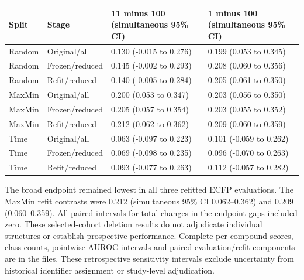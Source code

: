 \begin{center}
\footnotesize
\begin{tabularx}{\linewidth}{llXX}
\toprule
Split & Stage & 11 minus 100 (simultaneous 95\% CI) & 1 minus 100 (simultaneous 95\% CI) \\
\midrule
Random & Original/all & 0.130 (-0.015 to 0.276) & 0.199 (0.053 to 0.345) \\
Random & Frozen/reduced & 0.145 (-0.002 to 0.293) & 0.208 (0.060 to 0.356) \\
Random & Refit/reduced & 0.140 (-0.005 to 0.284) & 0.205 (0.061 to 0.350) \\
MaxMin & Original/all & 0.200 (0.053 to 0.347) & 0.203 (0.056 to 0.350) \\
MaxMin & Frozen/reduced & 0.205 (0.057 to 0.354) & 0.203 (0.055 to 0.352) \\
MaxMin & Refit/reduced & 0.212 (0.062 to 0.362) & 0.209 (0.060 to 0.359) \\
Time & Original/all & 0.063 (-0.097 to 0.223) & 0.101 (-0.059 to 0.262) \\
Time & Frozen/reduced & 0.069 (-0.098 to 0.235) & 0.096 (-0.070 to 0.263) \\
Time & Refit/reduced & 0.093 (-0.077 to 0.263) & 0.112 (-0.057 to 0.282) \\
\bottomrule
\end{tabularx}
\end{center}
The broad endpoint remained lowest in all three refitted ECFP evaluations. The MaxMin refit contrasts were 0.212 (simultaneous 95\% CI 0.062--0.362) and 0.209 (0.060--0.359). All paired intervals for total changes in the endpoint gaps included zero. These selected-cohort deletion results do not adjudicate individual structures or establish prospective performance. Complete per-compound scores, class counts, pointwise AUROC intervals and paired evaluation/refit components are in the  files. These retrospective sensitivity intervals
exclude uncertainty from historical identifier assignment or study-level adjudication.
